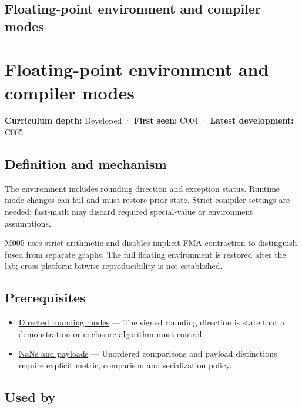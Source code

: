 \hypertarget{appendix-f11d1a521253}{}
\section*{Floating-point environment and compiler modes}
\chapter{Floating-point environment and compiler modes}\label{appendix-f11d1a521253-floating-point-environment-and-compiler-modes}

\textbf{Curriculum depth:} Developed · \textbf{First seen:} C004 · \textbf{Latest development:} C005

\section{Definition and mechanism}\label{appendix-f11d1a521253-definition-and-mechanism}

The environment includes rounding direction and exception status. Runtime mode changes can fail and must restore prior state. Strict compiler settings are needed; fast-math may discard required special-value or environment assumptions.

M005 uses strict arithmetic and disables implicit FMA contraction to distinguish fused from separate graphs. The full floating environment is restored after the lab; cross-platform bitwise reproducibility is not established.

\section{Prerequisites}\label{appendix-f11d1a521253-prerequisites}

\begin{itemize}
\tightlist
\item
  \hyperref[appendix-637d164ae5ca]{Directed rounding modes} --- The signed rounding direction is state that a demonstration or enclosure algorithm must control.
\item
  \hyperref[appendix-d6607cc4c235]{NaNs and payloads} --- Unordered comparisons and payload distinctions require explicit metric, comparison and serialization policy.
\end{itemize}

\section{Used by}\label{appendix-f11d1a521253-used-by}

